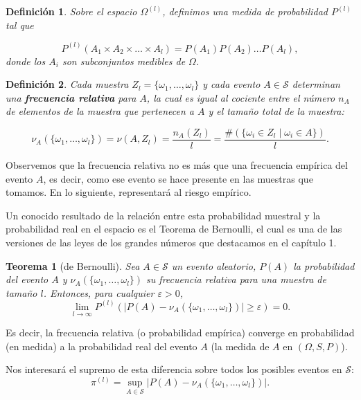 \documentclass{report}
\newtheorem{thm}{Teorema}[section]
\newtheorem{dfn}{Definición}[section]
\begin{document}
\begin{dfn}
    Sobre el espacio \( \Omega^{(l)} \), definimos una medida de probabilidad \( P^{(l)} \) tal que

\begin{equation}\label{def: probabilidad en espacio muestral}
P^{(l)}(A_1\times A_2 \times\dots\times A_l) = P(A_1) P(A_2) \dots P(A_l),
\end{equation}
donde los \( A_i \) son subconjuntos medibles de \( \Omega \).
\end{dfn}


\begin{dfn}
Cada muestra \( Z_l = \{\omega_1, \dots, \omega_l\} \) y cada evento \( A \in \mathcal{S} \) determinan
una \textbf{frecuencia relativa} para \( A \), la cual es igual al cociente entre
el número \( n_A \) de elementos de la muestra que pertenecen a \( A \) y el tamaño
total de la muestra:

\[
\nu_A(\{\omega_1,\dots, \omega_l\}) = \nu(A,Z_l) = \frac{n_A(Z_l)}{l} = \frac{\#(\{ \omega_i \in Z_l \mid \omega_i \in A \})}{l}.
\]

\end{dfn}

Observemos que la frecuencia relativa no es más que una frecuencia empírica del evento $A$, es decir, como ese evento
se hace presente en las muestras que tomamos. En lo siguiente, representará al riesgo
empírico.

Un conocido resultado de la relación entre esta probabilidad muestral y la probabilidad real en el espacio
es el Teorema de Bernoulli, el cual es una de las versiones de las leyes de los grandes números que destacamos en el capítulo 1.
\bigskip
\begin{thm}[de Bernoulli]
Sea \( A \in \mathcal{S} \) un evento aleatorio, $P(A)$ la probabilidad del evento $A$ y $\nu_A(\{\omega_1,\dots, \omega_l\})$ su frecuencia relativa para una muestra de
tamaño $l$. Entonces, para cualquier $\varepsilon > 0$,
\[
    \lim_{l\to\infty} P^{(l)}\left(| P(A)-\nu_A(\{\omega_1,\dots, \omega_l\})| \geq \varepsilon\right) = 0.
\]
\end{thm}

Es decir, la frecuencia relativa (o probabilidad empírica) converge en probabilidad (en medida) a la probabilidad real del evento $A$ (la medida de $A$ en $(\Omega, S, P)$).

Nos interesará el supremo de esta diferencia sobre todos los posibles eventos en $\mathcal{S}$:
\begin{equation}
    \pi^{(l)} = \sup_{A\in\mathcal{S}} |P(A)-\nu_A(\{\omega_1,\dots, \omega_l\})|. \label{def: funcion pi}
\end{equation}
\end{document}
